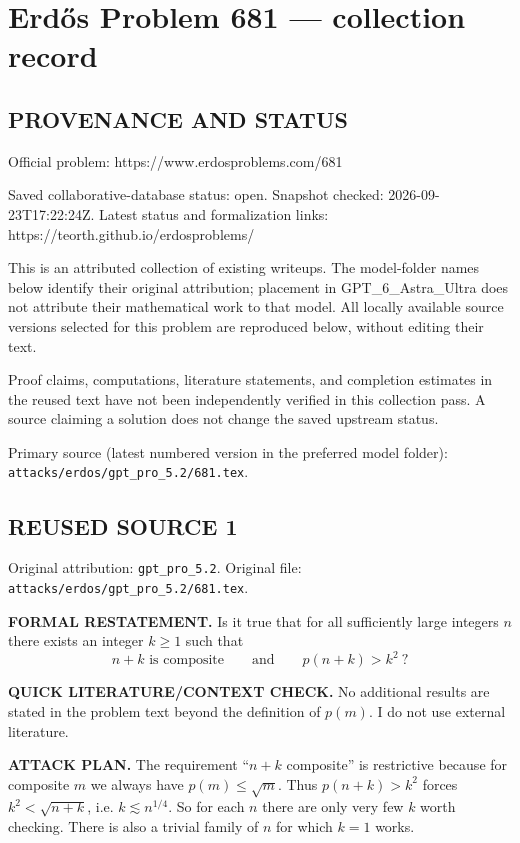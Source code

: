 \section*{Erd\H{o}s Problem 681 --- collection record}

\subsection*{PROVENANCE AND STATUS}
Official problem: https://www.erdosproblems.com/681

Saved collaborative-database status: open.
Snapshot checked: 2026-09-23T17:22:24Z.
Latest status and formalization links: https://teorth.github.io/erdosproblems/

This is an attributed collection of existing writeups. The model-folder names below identify their original attribution; placement in GPT\_6\_Astra\_Ultra does not attribute their mathematical work to that model. All locally available source versions selected for this problem are reproduced below, without editing their text.

Proof claims, computations, literature statements, and completion estimates in the reused text have not been independently verified in this collection pass. A source claiming a solution does not change the saved upstream status.

Primary source (latest numbered version in the preferred model folder): \texttt{attacks/erdos/gpt\_pro\_5.2/681.tex}.

\subsection*{REUSED SOURCE 1}
Original attribution: \texttt{gpt\_pro\_5.2}.
Original file: \texttt{attacks/erdos/gpt\_pro\_5.2/681.tex}.

\item
\textbf{FORMAL RESTATEMENT.}
Is it true that for all sufficiently large integers $n$ there exists an integer $k\ge1$ such that
\[
\text{$n+k$ is composite}\qquad\text{and}\qquad p(n+k)>k^{2}\ ?
\]

\textbf{QUICK LITERATURE/CONTEXT CHECK.}
No additional results are stated in the problem text beyond the definition of $p(m)$. I do not use external literature.

\textbf{ATTACK PLAN.}
The requirement ``$n+k$ composite'' is restrictive because for composite $m$ we always have $p(m)\le\sqrt m$. Thus $p(n+k)>k^{2}$ forces $k^{2}<\sqrt{n+k}$, i.e. $k\lesssim n^{1/4}$. So for each $n$ there are only very few $k$ worth checking. There is also a trivial family of $n$ for which $k=1$ works.

